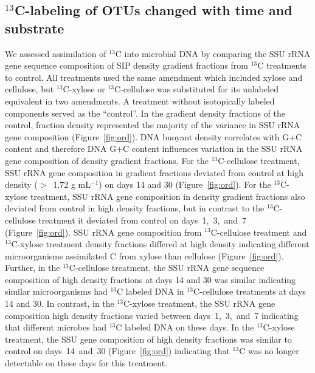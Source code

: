 \subsection{$^{13}$C-labeling of OTUs changed with time and substrate}
We assessed assimilation of $^{13}$C into microbial DNA by comparing the SSU
rRNA gene sequence composition of SIP density gradient fractions from $^{13}$C
treatments to control. All treatments used the same amendment which included
xylose and cellulose, but $^{13}$C-xylose or $^{13}$C-cellulose was substituted for its unlabeled
equivalent in two amendments. A treatment without isotopically labeled
components served as the ``control''. In the gradient density fractions of the
control, fraction density represented the majority of the variance in SSU rRNA
gene composition (Figure~\ref{fig:ord}). DNA buoyant density correlates with
G$+$C content \citep{Buckley_2007} and therefore DNA G$+$C content influences
variation in the SSU rRNA gene composition of density gradient fractions. For
the $^{13}$C-cellulose treatment, SSU rRNA gene composition in gradient
fractions deviated from control at high density ($>$~1.72 g mL$^{-1}$) on days
14 and 30 (Figure~\ref{fig:ord}). For the $^{13}$C-xylose treatment, SSU rRNA
gene composition in density gradient fractions also deviated from control in
high density fractions, but in contrast to the $^{13}$C-cellulose treatment it
deviated from control on days~1,~3,~and~7 (Figure~\ref{fig:ord}). SSU rRNA gene
composition from $^{13}$C-cellulose treatment and $^{13}$C-xylose treatment
density fractions differed at high density indicating different microorganisms
assimilated C from xylose than cellulose (Figure~\ref{fig:ord}). Further, in
the $^{13}$C-cellulose treatment, the SSU rRNA gene sequence composition of
high density fractions at days 14 and 30 was
similar indicating similar microorganisms had $^{13}$C labeled DNA in
$^{13}$C-cellulose treatments at days 14 and 30. In contrast, in the
$^{13}$C-xylose treatment, the SSU rRNA gene composition high density 
fractions varied between days~1,~3,~and~7 indicating that different microbes
had $^{13}$C labeled DNA on these days. In the $^{13}$C-xylose treatment, the
SSU gene composition of high density fractions was similar to control on
days~14~and~30 (Figure~\ref{fig:ord}) indicating that $^{13}$C was no longer
detectable on these days for this treatment. 

